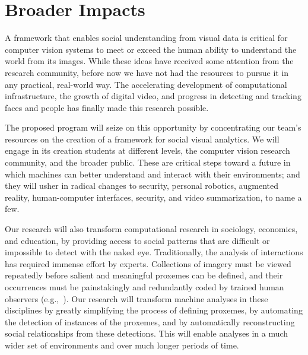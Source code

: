 \vspace{-8pt}
\section{Broader Impacts}
\label{sec:impacts}
\vspace{-8pt}
A framework that enables social understanding from visual data is critical for computer vision systems to meet or exceed the human ability to understand the world from its images. While these ideas have received some attention from the research community, before now we have not had the resources to pursue it in any practical, real-world way. The accelerating development of computational infrastructure, the growth of digital video, and progress in detecting and tracking faces and people has finally made this research possible. 

The proposed  program will seize on this opportunity by concentrating our team's resources on the creation of a  framework for social visual analytics.  We will engage in its creation students at different levels, the computer vision research community, and the broader public. These are critical steps toward a future in which machines can better understand and interact with their environments; and they will usher in radical changes to security, personal robotics, augmented reality, human-computer interfaces, security, and video summarization, to name a few.

Our research will also transform computational research in sociology, economics, and education, by providing access to social patterns that are difficult or impossible to detect with the naked eye. Traditionally, the analysis of interactions has required immense effort by experts. Collections of imagery must be viewed repeatedly before salient and meaningful proxemes can be defined, and their occurrences must be painstakingly and redundantly coded by trained human observers (e.g.,~\cite{Scherr2009}). Our research will transform machine analyses in these disciplines by greatly simplifying the process of defining proxemes, by automating the detection of instances of the proxemes, and by automatically reconstructing social relationships from these detections. This will enable analyses in a much wider set of environments and over much longer periods of time.

